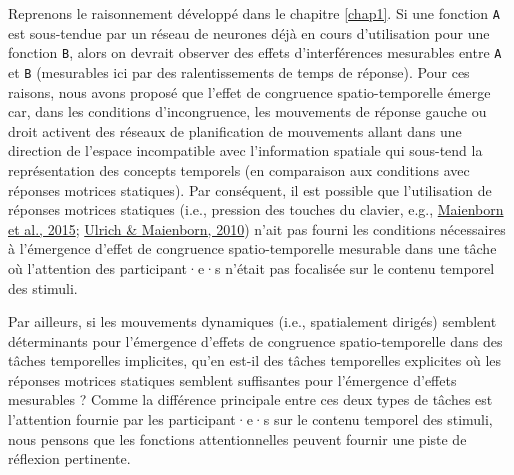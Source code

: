 \documentclass[
  a4paper,12pt,twoside,onecolumn,openright,final,oldfontcommands]{memoir}
\begin{document}
Reprenons le raisonnement développé dans le chapitre \ref{chap1}. Si une fonction \texttt{A} est sous-tendue par un réseau de neurones déjà en cours d'utilisation pour une fonction \texttt{B}, alors on devrait observer des effets d'interférences mesurables entre \texttt{A} et \texttt{B} (mesurables ici par des ralentissements de temps de réponse). Pour ces raisons, nous avons proposé que l'effet de congruence spatio-temporelle émerge car, dans les conditions d'incongruence, les mouvements de réponse gauche ou droit activent des réseaux de planification de mouvements allant dans une direction de l'espace incompatible avec l'information spatiale qui sous-tend la représentation des concepts temporels (en comparaison aux conditions avec réponses motrices statiques). Par conséquent, il est possible que l'utilisation de réponses motrices statiques (i.e., pression des touches du clavier, e.g., \protect\hyperlink{ref-maienborn_we_2015}{Maienborn et al., 2015}; \protect\hyperlink{ref-ulrich_leftright_2010}{Ulrich \& Maienborn, 2010}) n'ait pas fourni les conditions nécessaires à l'émergence d'effet de congruence spatio-temporelle mesurable dans une tâche où l'attention des participant·e·s n'était pas focalisée sur le contenu temporel des stimuli.

Par ailleurs, si les mouvements dynamiques (i.e., spatialement dirigés) semblent déterminants pour l'émergence d'effets de congruence spatio-temporelle dans des tâches temporelles implicites, qu'en est-il des tâches temporelles explicites où les réponses motrices statiques semblent suffisantes pour l'émergence d'effets mesurables ? Comme la différence principale entre ces deux types de tâches est l'attention fournie par les participant·e·s sur le contenu temporel des stimuli, nous pensons que les fonctions attentionnelles peuvent fournir une piste de réflexion pertinente.
\end{document}
